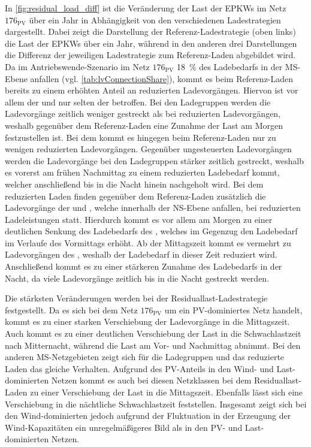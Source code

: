 

In \autoref{fig:residual_load_diff} ist die Veränderung der Last der \glspl{EPKW} im Netz \(176_{\text{PV}}\) über ein Jahr in Abhängigkeit von den verschiedenen Ladestrategien dargestellt.
Dabei zeigt die Darstellung der Referenz-Ladestrategie (oben links) die Last der \glspl{EPKW} über ein Jahr, während in den anderen drei Darstellungen die Differenz der jeweiligen Ladestrategie zum Referenz-Laden abgebildet wird.
Da im Antriebswende-Szenario im Netz \(176_{\text{PV}}\) \SI{18}{\percent} des Ladebedarfs in der \gls{MS}-Ebene anfallen (vgl. \autoref{tab:lvConnectionShare}), kommt es beim Referenz-Laden bereits zu einem erhöhten Anteil an reduzierten Ladevorgängen.
Hiervon ist vor allem der \UC \Firmeparkplatz und nur selten der \UC \zH betroffen.
Bei den Ladegruppen werden die Ladevorgänge zeitlich weniger gestreckt als bei reduzierten Ladevorgängen, weshalb gegenüber dem Referenz-Laden eine Zunahme der Last am Morgen festzustellen ist.
Bei dem \UC \zH kommt es hingegen beim Referenz-Laden nur zu wenigen reduzierten Ladevorgängen.
Gegenüber ungesteuerten Ladevorgängen werden die Ladevorgänge bei den Ladegruppen stärker zeitlich gestreckt, weshalb es vorerst am frühen Nachmittag zu einem reduzierten Ladebedarf kommt, welcher anschließend bis in die Nacht hinein nachgeholt wird.
Bei dem reduzierten Laden finden gegenüber dem Referenz-Laden zusätzlich die Ladevorgänge der \UCs \zH und \Firmeparkplatzdot, welche innerhalb der \gls{NS}-Ebene anfallen, bei reduzierten Ladeleistungen statt.
Hierdurch kommt es vor allem am Morgen zu einer deutlichen Senkung des Ladebedarfs des \UC \Firmeparkplatzdot, welches im Gegenzug den Ladebedarf im Verlaufe des Vormittags erhöht.
Ab der Mittagszeit kommt es vermehrt zu Ladevorgängen des \UC \zHdot, weshalb der Ladebedarf in dieser Zeit reduziert wird.
Anschließend kommt es zu einer stärkeren Zunahme des Ladebedarfs in der Nacht, da viele Ladevorgänge zeitlich bis in die Nacht gestreckt werden.



Die stärksten Veränderungen werden bei der Residuallast-Ladestrategie festgestellt.
Da es sich bei dem Netz \(176_{\text{PV}}\) um ein \gls{PV}-dominiertes Netz handelt, kommt es zu einer starken Verschiebung der Ladevorgänge in die Mittagszeit.
Auch kommt es zu einer deutlichen Verschiebung der Last in die Schwachlastzeit nach Mitternacht, während die Last am Vor- und Nachmittag abnimmt.
Bei den anderen \gls{MS}-Netzgebieten zeigt sich für die Ladegruppen und das reduzierte Laden das gleiche Verhalten.
Aufgrund des \gls{PV}-Anteils in den Wind- und Last-dominierten Netzen kommt es auch bei diesen Netzklassen bei dem Residuallast-Laden zu einer Verschiebung der Last in die Mittagszeit.
Ebenfalls lässt sich eine Verschiebung in die nächtliche Schwachlastzeit feststellen.
Insgesamt zeigt sich bei den Wind-dominierten jedoch aufgrund der Fluktuation in der Erzeugung der Wind-Kapazitäten ein unregelmäßigeres Bild als in den \gls{PV}- und Last-dominierten Netzen.


